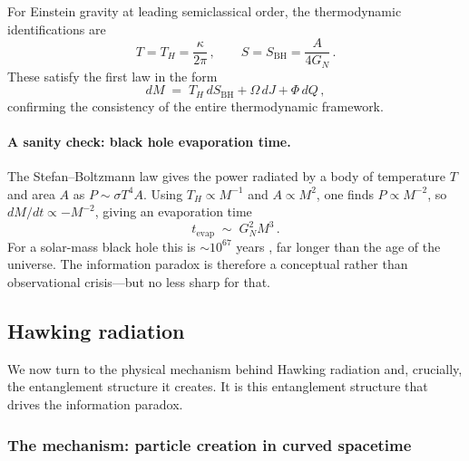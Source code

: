 \documentclass[11pt,letterpaper]{article}
\theoremstyle{plain}
\theoremstyle{definition}
\theoremstyle{remark}
\begin{document}
For Einstein gravity at leading semiclassical order, the thermodynamic
identifications are
\begin{equation}\label{eq03:thermo_identifications}
  T = T_{H} = \frac{\kappa}{2\pi}\,, \qquad
  S = S_{\mathrm{BH}} = \frac{A}{4G_{N}}\,.
\end{equation}
These satisfy the first law in the form
\begin{equation}\label{eq03:first_law}
  dM \;=\; T_{H}\, dS_{\mathrm{BH}} + \Omega\, dJ + \Phi\, dQ\,,
\end{equation}
confirming the consistency of the entire thermodynamic framework.

\paragraph{A sanity check: black hole evaporation time.}
The Stefan--Boltzmann law gives the power radiated by a body of
temperature $T$ and area $A$ as $P \sim \sigma T^{4} A$.  Using
$T_{H} \propto M^{-1}$ and $A \propto M^{2}$, one finds
$P \propto M^{-2}$, so $dM/dt \propto -M^{-2}$, giving an
evaporation time
\begin{equation}\label{eq03:evap_time}
  t_{\mathrm{evap}} \;\sim\; G_{N}^{2} M^{3}\,.
\end{equation}
For a solar-mass black hole this is $\sim 10^{67}$ years
\cite{page1976}, far longer than the age of the universe.  The information paradox is therefore
a conceptual rather than observational crisis---but no less sharp for that.

\subsection{Hawking radiation}\label{subsec03:hawking_radiation}

We now turn to the physical mechanism behind Hawking radiation and,
crucially, the entanglement structure it creates.  It is this
entanglement structure that drives the information paradox.

\subsubsection*{The mechanism: particle creation in curved spacetime}
\end{document}
